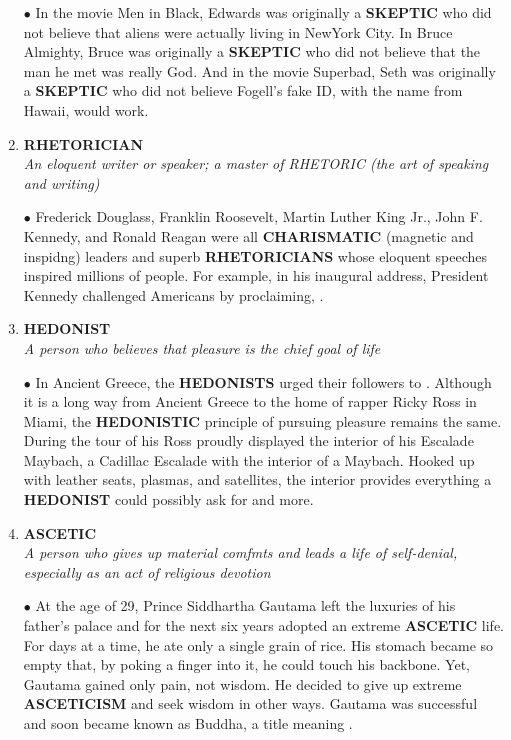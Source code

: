 \documentclass{book}
\begin{document}
\begin{enumerate}
$ \bullet $ In the movie Men in Black, Edwards was originally a
\textbf{SKEPTIC} who did not believe that aliens were actually
living in NewYork City. In Bruce Almighty, Bruce was
originally a \textbf{SKEPTIC} who did not believe that the
man he met was really God. And in the movie Superbad, Seth was originally a \textbf{SKEPTIC} who did not
believe Fogell's fake ID, with the name 
from Hawaii, would work.

 \item \textbf{RHETORICIAN}\\
\textit{An eloquent writer or speaker; a master of
RHETORIC (the art of speaking and writing)}

$ \bullet $ Frederick Douglass, Franklin Roosevelt, Martin
Luther King Jr., John F. Kennedy, and Ronald Reagan
were all \textbf{CHARISMATIC} (magnetic and inspidng)
leaders and superb \textbf{RHETORICIANS} whose eloquent
speeches inspired millions of people. For example, in
his inaugural address, President Kennedy challenged
Americans by proclaiming, .

 \item \textbf{HEDONIST}\\
\textit{A person who believes that pleasure is the chief
goal of life}

$ \bullet $ In Ancient Greece, the \textbf{HEDONISTS} urged their
followers to . Although it is a long way from Ancient Greece
to the home of rapper Ricky Ross in Miami, the
\textbf{HEDONISTIC} principle of pursuing pleasure remains
the same. During the tour of his  Ross proudly
displayed the interior of his Escalade Maybach, a
Cadillac Escalade with the interior of a Maybach.
Hooked up with leather seats, plasmas, and satellites,
the interior provides everything a \textbf{HEDONIST} could
possibly ask for and more.

 \item \textbf{ASCETIC}\\
\textit{A person who gives up material comfmts and
leads a life of self-denial, especially as an act of
religious devotion}

$ \bullet $ At the age of 29, Prince Siddhartha Gautama left the
luxuries of his father's palace and for the next six
years adopted an extreme \textbf{ASCETIC} life. For days at a
time, he ate only a single grain of rice. His stomach
became so empty that, by poking a finger into it, he
could touch his backbone. Yet, Gautama gained only
pain, not wisdom. He decided to give up extreme
\textbf{ASCETICISM} and seek wisdom in other ways.
Gautama was successful and soon became known as
Buddha, a title meaning .


\end{enumerate}
\end{document}
